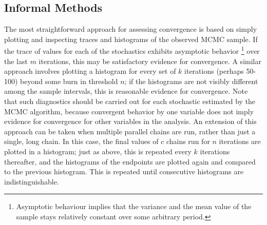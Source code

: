 \documentclass[letterpaper,10pt,english]{sphinxmanual}
\begin{document}
\subsection{Informal Methods}
\label{modelchecking:informal-methods}
The most straightforward approach for assessing convergence is based on simply plotting and inspecting traces and histograms of the observed MCMC sample. If the trace of values for each of the stochastics exhibits asymptotic behavior \footnote{
Asymptotic behaviour implies that the variance and the mean value of the sample
stays relatively constant over some arbitrary period.
} over the last $m$ iterations, this may be satisfactory evidence for convergence. A similar approach involves plotting a histogram for every set of $k$ iterations (perhaps 50-100) beyond some burn in threshold $n$; if the histograms are not visibly different among the sample intervals, this is reasonable evidence for convergence. Note that such diagnostics should be carried out for each stochastic estimated by the MCMC algorithm, because convergent behavior by one variable does not imply evidence for convergence for other variables in the analysis. An extension of this approach can be taken when multiple parallel chains are run, rather than just a single, long chain. In this case, the final values of $c$ chains run for $n$ iterations are plotted in a histogram; just as above, this is repeated every $k$ iterations thereafter, and the histograms of the endpoints are plotted again and compared to the previous histogram. This is repeated until consecutive histograms are indistinguishable.
\end{document}
